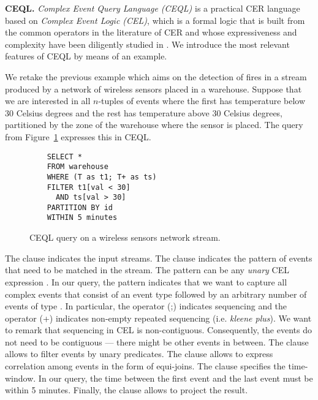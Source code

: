 \textbf{CEQL.} \emph{Complex Event Query Language (CEQL)} is a practical CER language based on \emph{Complex Event Logic (CEL)}, which is a formal logic that is built from the common operators in the literature of CER and whose expressiveness and complexity have been diligently studied in \cite{formal-framework-cep,on-the-expressiveness,formal-framework-cer}. We introduce the most relevant features of CEQL by means of an example.

\begin{example}
We retake the previous example which aims on the detection of fires in a stream produced by a network of wireless sensors placed in a warehouse. Suppose that we are interested in all $n$-tuples of  events where the first has temperature below $30$ Celsius degrees and the rest has temperature above $30$ Celsius degrees, partitioned by the zone of the warehouse where the sensor is placed. The query from Figure~\ref{fig:query:2} expresses this in CEQL.

\begin{figure}[H]
  \begin{verbatim}
    SELECT *
    FROM warehouse
    WHERE (T as t1; T+ as ts)
    FILTER t1[val < 30]
      AND ts[val > 30]
    PARTITION BY id
    WITHIN 5 minutes
  \end{verbatim}
  \caption{CEQL query on a wireless sensors network stream.}
  \label{fig:query:2}
\end{figure}

The  clause indicates the input streams. The  clause indicates the pattern of events that need to be matched in the stream. The pattern can be any \emph{unary} CEL expression \cite{formal-framework-cer}. In our query, the pattern  indicates that we want to capture all complex events that consist of an event type  followed by an arbitrary number of events of type . In particular, the operator (;) indicates sequencing and the operator (+) indicates non-empty repeated sequencing (i.e. \emph{kleene plus}). We want to remark that sequencing in CEL is non-contiguous. Consequently, the  events do not need to be contiguous --- there might be other events in between. The  clause allows to filter events by unary predicates. The clause  allows to express correlation among events in the form of equi-joins. The  clause specifies the time-window. In our query, the time between the first event  and the last event  must be within 5 minutes. Finally, the  clause allows to project the result.
\end{example}


